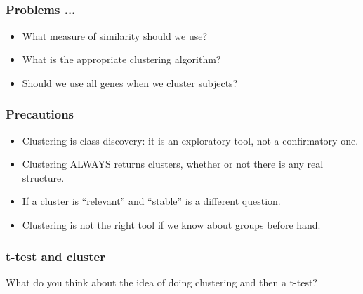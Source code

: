





\subsection{}
\begin{frame}
\frametitle{Problems ...}
\begin{itemize}
\item What measure of similarity should we use?
\item What is the appropriate clustering algorithm?
\item Should we use all genes when we cluster subjects?
\end{itemize}
\end{frame}



\begin{frame}
\frametitle{Precautions}
\begin{itemize}
\item Clustering is class discovery: it is an exploratory tool, not a
  confirmatory one.
  
\item Clustering ALWAYS returns clusters, whether or not there is any real
  structure. 
\item If a cluster is ``relevant'' and ``stable'' is a different question.
\item Clustering is not the right tool if we know about groups before hand.
\end{itemize}
\end{frame}

\begin{frame}
\frametitle{t-test and cluster}
What do you think about the idea of doing clustering and then a t-test?
\end{frame}


